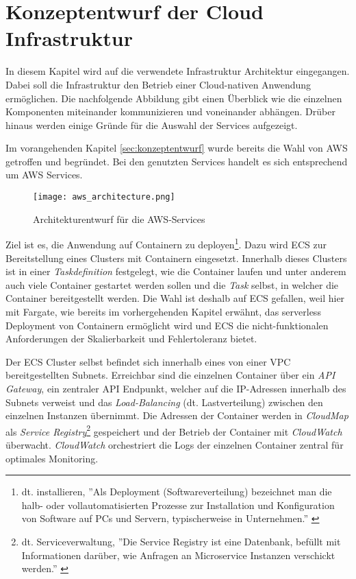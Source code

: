 \section{Konzeptentwurf der Cloud Infrastruktur}
\label{sec:cloud-infra}
In diesem Kapitel wird auf die verwendete Infrastruktur Architektur eingegangen. %
Dabei soll die Infrastruktur den Betrieb einer Cloud-nativen Anwendung ermöglichen. Die nachfolgende Abbildung gibt einen Überblick wie die einzelnen Komponenten miteinander kommunizieren und voneinander abhängen. Drüber hinaus werden einige Gründe für die Auswahl der Services aufgezeigt.

Im vorangehenden Kapitel \ref{sec:konzeptentwurf} wurde bereits die Wahl von \ac{AWS} getroffen und begründet. Bei den genutzten Services handelt es sich entsprechend um \ac{AWS} Services.

\begin{figure}[H]
    \centering
    \texttt{[image: aws\_architecture.png]}
    \caption{Architekturentwurf für die AWS-Services}
    \label{fig:CloudArchitektur}
\end{figure}

Ziel ist es, die Anwendung auf Containern zu deployen\footnote{dt. installieren, ''Als Deployment (Softwareverteilung) bezeichnet man die halb- oder vollautomatisierten Prozesse zur Installation und Konfiguration von Software auf PCs und Servern, typischerweise in Unternehmen.'' \cite[][]{arocom}}. Dazu wird \ac{ECS} zur Bereitstellung eines Clusters mit Containern eingesetzt. Innerhalb dieses Clusters ist in einer \textit{Taskdefinition} festgelegt, wie die Container laufen und unter anderem auch viele Container gestartet werden sollen und die \textit{Task} selbst, in welcher die Container bereitgestellt werden. Die Wahl ist deshalb auf \ac{ECS} gefallen, weil hier mit \gls{Fargate}, wie bereits im vorhergehenden Kapitel erwähnt, das serverless Deployment von Containern ermöglicht wird und \ac{ECS} die nicht-funktionalen Anforderungen der Skalierbarkeit und Fehlertoleranz bietet. \pagebreak

Der \ac{ECS} Cluster selbst befindet sich innerhalb eines von einer \ac{VPC} bereitgestellten Subnets. Erreichbar sind die einzelnen Container über ein \textit{API Gateway}, ein zentraler API Endpunkt, welcher auf die IP-Adressen innerhalb des Subnets verweist und das \textit{Load-Balancing} (dt. Lastverteilung) zwischen den einzelnen Instanzen übernimmt. Die Adressen der Container werden in \textit{CloudMap} als \textit{Service Registry}\footnote{dt. Serviceverwaltung, ''Die Service Registry ist eine Datenbank, befüllt mit Informationen darüber, wie Anfragen an Microservice Instanzen verschickt werden.'' \cite[Übersetzt aus dem Englischen][]{Peyrott2015}} gespeichert und der Betrieb der Container mit \textit{CloudWatch} überwacht. \textit{CloudWatch} orchestriert die Logs der einzelnen Container zentral für optimales Monitoring.

